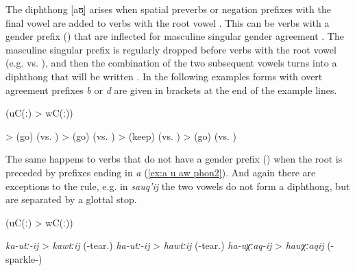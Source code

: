The diphthong [aʊ̯] arises when spatial preverbs or negation prefixes with the final vowel  are added to verbs with the root vowel . This can be verbs with a gender prefix () that are inflected for masculine singular gender agreement . The masculine singular prefix  is regularly dropped before verbs with the root vowel  (e.g.   vs.  ), and then the combination of the two subsequent vowels turns into a diphthong that will be written  . In the following examples forms with overt agreement prefixes \textit{b} or \textit{d} are given in brackets at the end of the example lines.
%
\begin{exe}
	 (uC(ː) > wC(ː)) \label{ex:a u aw phon}
	\begin{xlist}
		\ex	{} >   (go) (vs. ) 
		\ex	{} >   (go) (vs. )
		\ex	{} >   (keep) (vs. )
		\ex	{} >   (go) (vs. )
	\end{xlist}
\end{exe}

The same happens to verbs that do not have a gender prefix () when the root is preceded by prefixes ending in \textit{a} (\ref{ex:a u aw phon2}). And again there are exceptions to the rule, e.g. in \textit{sauq'ij}  the two vowels do not form a diphthong, but are separated by a glottal stop.
%
\begin{exe}
	 (uC(ː) > wC(ː)) \label{ex:a u aw phon2}
	\begin{xlist}
		\ex	\textit{ka-utː-ij} > \textit{kawtːij}  (-tear.\tsc{ipfv-inf})
		\ex \textit{ha-utː-ij} > \textit{hawtːij}  (-tear.\tsc{ipfv-inf})
		\ex \textit{ha-uχːaq-ij} > \textit{hawχːaqij}  (-sparkle-\tsc{caus-inf})
	\end{xlist}
\end{exe}


